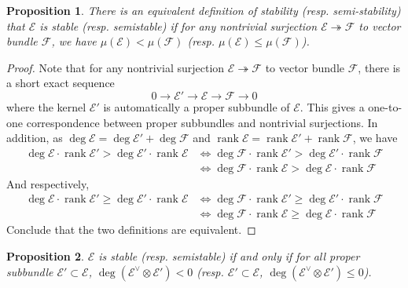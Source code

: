 \documentclass{ctexart}
\newtheorem{proposition}{Proposition}[section]
\newcommand{\rank}{\operatorname{rank}}
\begin{document}
\begin{proposition}
    There is an equivalent definition of stability (resp. semi-stability) that $\mathcal{E}$ is stable (resp. semistable) if for any nontrivial surjection $\mathcal{E} \twoheadrightarrow \mathcal{F}$ to vector bundle $\mathcal{F}$,
    we have $\mu(\mathcal{E}) < \mu(\mathcal{F})$ (resp. $\mu(\mathcal{E}) \le \mu(\mathcal{F})$).
    \label{Proposition 6.1}
\end{proposition}
\begin{proof}
    Note that for any nontrivial surjection $\mathcal{E} \twoheadrightarrow \mathcal{F}$ to vector bundle $\mathcal{F}$,
    there is a short exact sequence
    \begin{equation}
        0 \longrightarrow \mathcal{E}' \longrightarrow \mathcal{E} \longrightarrow \mathcal{F} \longrightarrow 0
    \end{equation}
    where the kernel $\mathcal{E}'$ is automatically a proper subbundle of $\mathcal{E}$.
    This gives a one-to-one correspondence between proper subbundles and nontrivial surjections.
    In addition, as $\deg \mathcal{E} = \deg \mathcal{E}' + \deg \mathcal{F}$ and $\rank \mathcal{E} = \rank \mathcal{E}' + \rank \mathcal{F}$, we have
    \begin{equation}
        \begin{split}
            \deg \mathcal{E} \cdot \rank \mathcal{E}' > \deg \mathcal{E}' \cdot \rank \mathcal{E} & \iff \deg \mathcal{F} \cdot \rank \mathcal{E}' > \deg \mathcal{E}' \cdot \rank \mathcal{F} \\
            & \iff \deg \mathcal{F} \cdot \rank \mathcal{E} > \deg \mathcal{E} \cdot \rank \mathcal{F} 
        \end{split}
    \end{equation}
    And respectively,
    \begin{equation}
        \begin{split}
            \deg \mathcal{E} \cdot \rank \mathcal{E}' \ge \deg \mathcal{E}' \cdot \rank \mathcal{E} & \iff \deg \mathcal{F} \cdot \rank \mathcal{E}' \ge \deg \mathcal{E}' \cdot \rank \mathcal{F} \\
            & \iff \deg \mathcal{F} \cdot \rank \mathcal{E} \ge \deg \mathcal{E} \cdot \rank \mathcal{F} 
        \end{split}
    \end{equation}
    Conclude that the two definitions are equivalent.
\end{proof}
\begin{proposition}
    $\mathcal{E}$ is stable (resp. semistable) if and only if for all proper subbundle $\mathcal{E}' \subset \mathcal{E}$,
    $\deg (\mathcal{E}^{\vee} \otimes \mathcal{E}') < 0$ (resp. $\mathcal{E}' \subset \mathcal{E}$, $\deg (\mathcal{E}^{\vee} \otimes \mathcal{E}') \le 0$).
    \label{Proposition 6.2}
\end{proposition}
\end{document}
